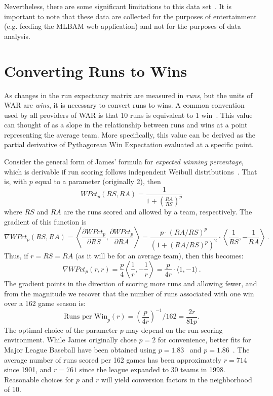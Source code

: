 \documentclass[letterpaper,titlepage]{article}
\begin{document}
Nevertheless, there are some significant limitations to this data set~\citep{fastdips}. It is important to note that these data are collected for the purposes of entertainment (e.g. feeding the MLBAM web application) and not for the purposes of data analysis. 


\section{Converting Runs to Wins}
\label{apx:pythag}

As changes in the run expectancy matrix are measured in \emph{runs}, but the units of WAR are \emph{wins}, it is necessary to convert runs to wins. A common convention used by all providers of WAR is that 10 runs is equivalent to 1 win~\citep{cameron2008win}. This value can thought of as a slope in the relationship between runs and wins at a point representing the average team. More specifically, this value can be derived as the partial derivative of Pythagorean Win Expectation evaluated at a specific point. 

Consider the general form of James' formula for \emph{expected winning percentage}, which is derivable if run scoring follows independent Weibull distributions~\citep{miller2007derivation}. That is, with $p$ equal to a parameter (originally 2), then 
$$
	WPct_p(RS, RA) = \frac{1}{1 + \left( \frac{RA}{RS} \right)^p}
$$
where $RS$ and $RA$ are the runs scored and allowed by a team, respectively. The gradient of this function is
$$
	\nabla WPct_p(RS, RA) = \left\langle \frac{\partial WPct_p}{\partial RS} , \frac{\partial WPct_p}{\partial RA} \right\rangle = \frac{p \cdot (RA/RS)^p}{(1 + (RA/RS)^p)^2} \cdot \left\langle \frac{1}{RS}, -\frac{1}{RA} \right\rangle \,.
$$
Thus, if $r=RS=RA$ (as it will be for an average team), then this becomes:
$$
	\nabla WPct_p (r,r) = \frac{p}{4} \left\langle \frac{1}{r}, -\frac{1}{r} \right\rangle = \frac{p}{4r} \cdot \langle 1, -1 \rangle \,.
$$
The gradient points in the direction of scoring more runs and allowing fewer, and from the magnitude we recover that the number of runs associated with one win over a 162 game season is:
$$
	\text{Runs per Win}_p(r) = \left( \frac{p}{4r} \right)^{-1} / 162 = \frac{2r}{81p}.
$$	
The optimal choice of the parameter $p$ may depend on the run-scoring environment. While James originally chose $p=2$ for convenience, better fits for Major League Baseball have been obtained using $p=1.83$~\citep{davenport1999pythag} and $p=1.86$~\citep{tung2010confidence}. The average number of runs scored per 162 games has been approximately $r=714$ since 1901, and $r=761$ since the league expanded to 30 teams in 1998. Reasonable choices for $p$ and $r$ will yield conversion factors in the neighborhood of 10.  





\end{document}
